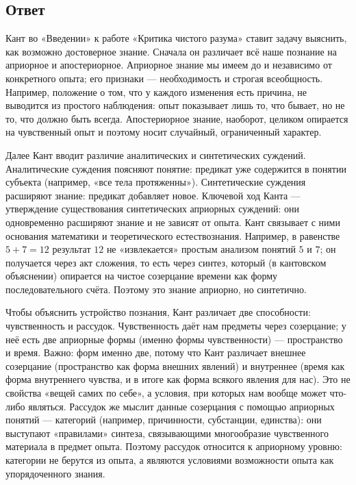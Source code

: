 \documentclass[a4paper,12pt]{article}
\begin{document}
\subsection{Ответ}

Кант во «Введении» к работе «Критика чистого разума» ставит задачу выяснить, как возможно достоверное знание. Сначала он различает всё наше познание на априорное и апостериорное. Априорное знание мы имеем до и независимо от конкретного опыта; его признаки — необходимость и строгая всеобщность. Например, положение о том, что у каждого изменения есть причина, не выводится из простого наблюдения: опыт показывает лишь то, что бывает, но не то, что должно быть всегда. Апостериорное знание, наоборот, целиком опирается на чувственный опыт и поэтому носит случайный, ограниченный характер.

Далее Кант вводит различие аналитических и синтетических суждений. Аналитические суждения поясняют понятие: предикат уже содержится в понятии субъекта (например, «все тела протяженны»). Синтетические суждения расширяют знание: предикат добавляет новое. Ключевой ход Канта — утверждение существования синтетических априорных суждений: они одновременно расширяют знание и не зависят от опыта. Кант связывает с ними основания математики и теоретического естествознания. Например, в равенстве $5+7=12$ результат $12$ не «извлекается» простым анализом понятий $5$ и $7$; он получается через акт сложения, то есть через синтез, который (в кантовском объяснении) опирается на чистое созерцание времени как форму последовательного счёта. Поэтому это знание априорно, но синтетично.

Чтобы объяснить устройство познания, Кант различает две способности: чувственность и рассудок. Чувственность даёт нам предметы через созерцание; у неё есть две априорные формы (именно формы чувственности) — пространство и время. Важно: форм именно две, потому что Кант различает внешнее созерцание (пространство как форма внешних явлений) и внутреннее (время как форма внутреннего чувства, и в итоге как форма всякого явления для нас). Это не свойства «вещей самих по себе», а условия, при которых нам вообще может что-либо являться. Рассудок же мыслит данные созерцания с помощью априорных понятий — категорий (например, причинности, субстанции, единства): они выступают «правилами» синтеза, связывающими многообразие чувственного материала в предмет опыта. Поэтому рассудок относится к априорному уровню: категории не берутся из опыта, а являются условиями возможности опыта как упорядоченного знания.
\end{document}
